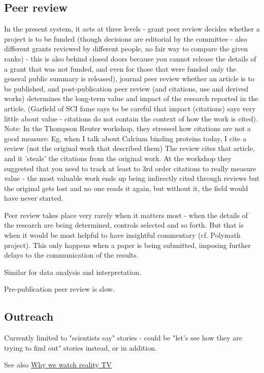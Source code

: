 \documentclass[final,authoryear,3p]{elsarticle-open-drafting}
\begin{document}
\subsection{Peer review}
In the present system, it acts at three levels - grant peer review decides whether a project is to be funded (though decisions are editorial by the committee - also different grants reviewed by different people, no fair way to compare the given ranks) - this is also behind closed doors because you cannot release the details of a grant that was not funded, and even for those that were funded only the general public summary is released), journal peer review  whether an article is to be published, and post-publication peer review (and citations, use and derived works) determines the long-term value and impact of the research reported in the article. (Garfield of SCI fame says to be careful that impact (citations) says very little about value  - citations do not contain the context of how the work is cited). 
Note: In the Thompson Reuter workshop, they stressed how citations are not a good measure: Eg, when I talk about Calcium binding proteins today, I cite a review (not the original work that described them) The review cites that article, and it 'steals' the citations from the original work. At the workshop they suggested that you need to track at least to 3rd order citations to really measure value - the most valuable work ends up being indirectly cited through reviews but the original gets lost and no one reads it again, but without it, the field would have never started. 

Peer review takes place very rarely when it matters most - when the details of the research are being determined, controls selected and so forth. But that is when it would be most helpful to have insightful commentary (cf. Polymath project). This only happens when a paper is being submitted, imposing further delays to the communication of the results. 

Similar for data analysis and interpretation.

Pre-publication peer review is slow.

\subsection{Outreach}
Currently limited to "scientists say" stories - could be "let's see how they are trying to find out" stories instead, or in addition.

See also \href{http://psych-your-mind.blogspot.com/2011/06/why-we-watch-reality-tv.html}{Why we watch reality TV}
\end{document}
